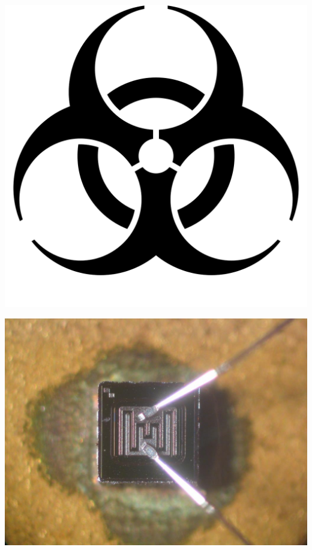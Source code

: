 {
\begin{center}
\includegraphics[scale=0.5]{svg/biohazard}
\end{center}
}


\slide{} %
{
\begin{center}
\includegraphics[scale=0.33]{pic/transistor}
\end{center}
}

